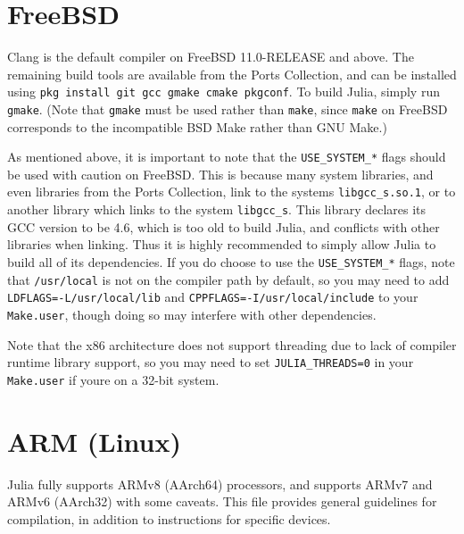 \hypertarget{3581420464307357684}{}


\section{FreeBSD}



Clang is the default compiler on FreeBSD 11.0-RELEASE and above. The remaining build tools are available from the Ports Collection, and can be installed using \texttt{pkg install git gcc gmake cmake pkgconf}. To build Julia, simply run \texttt{gmake}. (Note that \texttt{gmake} must be used rather than \texttt{make}, since \texttt{make} on FreeBSD corresponds to the incompatible BSD Make rather than GNU Make.)



As mentioned above, it is important to note that the \texttt{USE\_SYSTEM\_*} flags should be used with caution on FreeBSD. This is because many system libraries, and even libraries from the Ports Collection, link to the system{\textquotesingle}s \texttt{libgcc\_s.so.1}, or to another library which links to the system \texttt{libgcc\_s}. This library declares its GCC version to be 4.6, which is too old to build Julia, and conflicts with other libraries when linking. Thus it is highly recommended to simply allow Julia to build all of its dependencies. If you do choose to use the \texttt{USE\_SYSTEM\_*} flags, note that \texttt{/usr/local} is not on the compiler path by default, so you may need to add \texttt{LDFLAGS=-L/usr/local/lib} and \texttt{CPPFLAGS=-I/usr/local/include} to your \texttt{Make.user}, though doing so may interfere with other dependencies.



Note that the x86 architecture does not support threading due to lack of compiler runtime library support, so you may need to set \texttt{JULIA\_THREADS=0} in your \texttt{Make.user} if you{\textquotesingle}re on a 32-bit system.



\hypertarget{7093051588243331933}{}


\section{ARM (Linux)}



Julia fully supports ARMv8 (AArch64) processors, and supports ARMv7 and ARMv6 (AArch32) with some caveats. This file provides general guidelines for compilation, in addition to instructions for specific devices.



